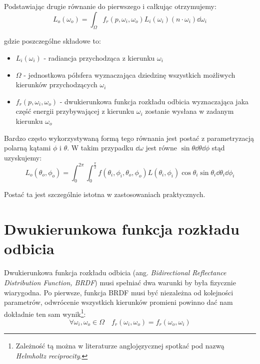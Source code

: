 \documentclass[../main.tex]{subfiles}
\begin{document}
Podstawiając drugie równanie do pierwszego i całkując otrzymujemy:
\[
  L_{o}(\omega_o) =
  \int_{\Omega} {
    f_r(p, \omega_i, \omega_o)
    L_i(\omega_i)
    (n \cdot \omega_i)
    \dd{\omega_i}
  }
\]

\noindent gdzie poszczególne składowe to:

\begin{itemize}

  \item $L_i(\omega_i)$ - radiancja przychodząca z kierunku $\omega_i$

  \item $\Omega$ - jednostkowa półsfera wyznaczająca dziedzinę wszystkich
    możliwych kierunków przychodzących $\omega_i$

  \item $f_{r}(p, \omega_i, \omega_o)$ - dwukierunkowa funkcja rozkładu odbicia wyznaczająca jaka część energii przybywającej z kierunku $\omega_i$ zostanie wysłana w zadanym kierunku $\omega_o$

\end{itemize}

Bardzo często wykorzystywaną formą tego równania jest postać z parametryzacją polarną kątami $\phi$ i $\theta$. W takim przypadku $\dd \omega$ jest równe $\sin\theta \dd\theta \dd\phi$ \cite{wolfram_solidangle} stąd uzyskujemy:
\[
L_{o}(\theta_o, \phi_o) = \int_{0}^{2\pi} \int_{0}^{\frac{\pi}{2}} {
	f(\theta_i, \phi_i, \theta_o, \phi_o)L(\theta_i, \phi_i) \cos\theta_i \sin\theta_i
} \dd\theta_i \dd\phi_i
\]

\noindent Postać ta jest szczególnie istotna w zastosowaniach praktycznych.

\section{Dwukierunkowa funkcja rozkładu odbicia}

Dwukierunkowa funkcja rozkładu odbicia (ang. \textit{Bidirectional Reflectance Distribution Function, BRDF}) musi spełniać dwa warunki by była fizycznie wiarygodna. Po pierwsze, funkcja BRDF musi być niezależna od kolejności parametrów, odwrócenie wszystkich kierunków promieni powinno dać nam dokładnie ten sam wynik\footnote{Zależność tą można w literaturze anglojęzycznej spotkać pod nazwą \textit{Helmholtz reciprocity}.}:
\[
  \forall{\omega_i, \omega_o \in \Omega} \quad
  f_r(\omega_i, \omega_o) = f_r(\omega_o, \omega_i)
\]
\end{document}
